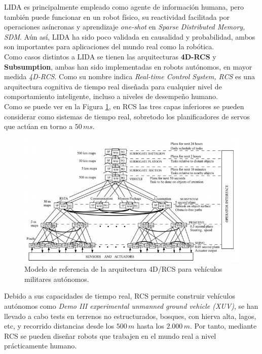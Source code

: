 \documentclass[a4paper, fontsize=11pt]{scrartcl} %
\numberwithin{equation}{section} %
\numberwithin{figure}{section} %
\numberwithin{table}{section} %
\begin{document}
	LIDA es principalmente empleado como agente de información humana, pero también puede funcionar en un robot físico, su reactividad facilitada por operaciones asíncronas y aprendizaje \textit{one-shot} en \textit{Sparse Distributed Memory, SDM}. Aún así, LIDA ha sido poco validada en causalidad y probabilidad, ambos son importantes para aplicaciones del mundo real como la robótica.\\
	
	Como casos distintos a LIDA se tienen las arquitecturas \textbf{4D-RCS}\cite{4DRCS} y \textbf{Subsumption}\cite{SUBSUMPTION}, ambas han sido implementadas en robots autónomos, en mayor medida \textit{4D-RCS}. Como su nombre indica \textit{Real-time Control System, RCS} es una arquitectura cognitiva de tiempo real diseñada para cualquier nivel de comportamiento inteligente, incluso a niveles de desempeño humano.\\
	
	Como se puede ver en la Figura \ref{RCS}, en RCS las tres capas inferiores se pueden considerar como sistemas de tiempo real, sobretodo los planificadores de servos que actúan en torno a $50\,ms$.\\
	
	\begin{figure}[h!]
		\centering
		\includegraphics[width=0.8\linewidth]{images/RCS.png}
		\caption{Modelo de referencia de la arquitectura 4D/RCS para vehículos militares autónomos\cite{4DRCS}.}
		\label{RCS}
	\end{figure}
	\FloatBarrier
	
	Debido a sus capacidades de tiempo real, RCS permite construir vehículos autónomos como \textit{Demo III experimental unmanned ground vehicle (XUV)}, se han llevado a cabo tests en terrenos no estructurados, bosques, con hierva alta, lagos, etc, y recorrido distancias desde los $500\,m$ hasta los $2.000\,m$. Por tanto, mediante RCS se pueden diseñar robots que trabajen en el mundo real a nivel prácticamente humano.\\
	
\end{document}
